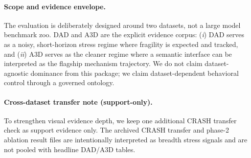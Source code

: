 \paragraph{Scope and evidence envelope.}
The evaluation is deliberately designed around two datasets, not a large model
benchmark zoo. DAD and A3D are the explicit evidence corpus:
(\emph{i}) DAD serves as a noisy, short-horizon stress regime where fragility
is expected and tracked, and
(\emph{ii}) A3D serves as the cleaner regime where a semantic interface can be
interpreted as the flagship mechanism trajectory.
We do not claim dataset-agnostic dominance from this package; we claim
dataset-dependent behavioral control through a governed ontology.
\paragraph{Cross-dataset transfer note (support-only).}
To strengthen visual evidence depth, we keep one additional CRASH transfer check
as support evidence only. The archived CRASH transfer and phase-2 ablation
result files are intentionally interpreted as breadth stress signals and are not
pooled with headline DAD/A3D tables.

